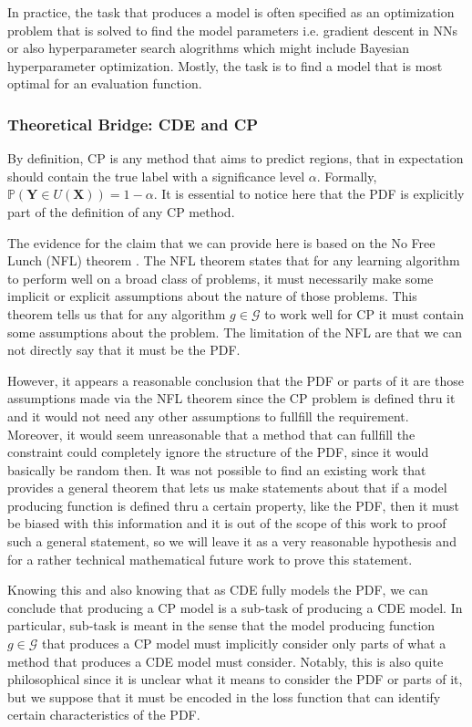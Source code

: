 In practice, the task that produces a model is often specified as an optimization problem that is solved to find the model parameters i.e. gradient descent in NNs or also hyperparameter search alogrithms which might include Bayesian hyperparameter optimization. Mostly, the task is to find a model that is most optimal for an evaluation function.

\subsubsection{Theoretical Bridge: CDE and CP}\label{sec:bridge_cde_cp}

By definition, CP is any method that aims to predict regions, that in expectation should contain the true label with a significance level $\alpha$. Formally,  $\mathbb{P}(\mathbf{Y} \in U(\mathbf{X})) = 1 - \alpha$. It is essential to notice here that the PDF is explicitly part of the definition of any CP method.

The evidence for the claim that we can provide here is based on the No Free Lunch (NFL) theorem \cite{wolpert1997no}. The NFL theorem states that for any learning algorithm to perform well on a broad class of problems, it must necessarily make some implicit or explicit assumptions about the nature of those problems. This theorem tells us that for any algorithm $g\in\mathcal{G}$ to work well for CP it must contain some assumptions about the problem. The limitation of the NFL are that we can not directly say that it must be the PDF.

However, it appears a reasonable conclusion that the PDF or parts of it are those assumptions made via the NFL theorem since the CP problem is defined thru it and it would not need any other assumptions to fullfill the requirement. Moreover, it would seem unreasonable that a method that can fullfill the constraint could completely ignore the structure of the PDF, since it would basically be random then. It was not possible to find an existing work that provides a general theorem that lets us make statements about that if a model producing function is defined thru a certain property, like the PDF, then it must be biased with this information and it is out of the scope of this work to proof such a general statement, so we will leave it as a very reasonable hypothesis and for a rather technical mathematical future work to prove this statement.

Knowing this and also knowing that as CDE fully models the PDF, we can conclude that producing a CP model is a sub-task of producing a CDE model. In particular, sub-task is meant in the sense that the model producing function $g \in \mathcal{G}$ that produces a CP model must implicitly consider only parts of what a method that produces a CDE model must consider. Notably, this is also quite philosophical since it is unclear what it means to consider the PDF or parts of it, but we suppose that it must be encoded in the loss function that can identify certain characteristics of the PDF.

